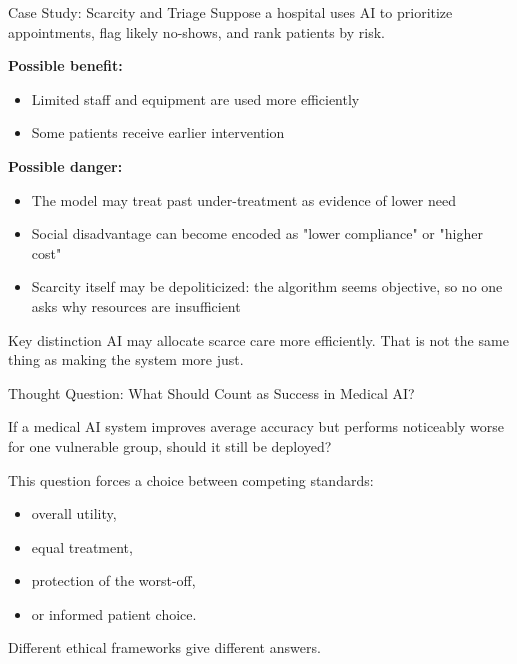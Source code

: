 \documentclass[aspectratio=169,11pt]{beamer}
\begin{document}
\begin{frame}{Case Study: Scarcity and Triage}
Suppose a hospital uses AI to prioritize appointments, flag likely no-shows, and rank patients by risk.

\vspace{0.2cm}
\textbf{Possible benefit:}
\begin{itemize}
    \item Limited staff and equipment are used more efficiently
    \item Some patients receive earlier intervention
\end{itemize}

\vspace{0.2cm}
\textbf{Possible danger:}
\begin{itemize}
    \item The model may treat past under-treatment as evidence of lower need
    \item Social disadvantage can become encoded as "lower compliance" or "higher cost"
    \item Scarcity itself may be depoliticized: the algorithm seems objective, so no one asks why resources are insufficient
\end{itemize}

\begin{alertblock}{Key distinction}
AI may allocate scarce care more efficiently. That is not the same thing as making the system more just.
\end{alertblock}
\end{frame}

\begin{frame}{Thought Question: What Should Count as Success in Medical AI?}
\begin{discussionbox}
\scriptsize
If a medical AI system improves average accuracy but performs noticeably worse for one vulnerable group, should it still be deployed?
\end{discussionbox}

\vspace{0.2cm}
This question forces a choice between competing standards:
\begin{itemize}
    \item overall utility,
    \item equal treatment,
    \item protection of the worst-off,
    \item or informed patient choice.
\end{itemize}

\vspace{0.2cm}
Different ethical frameworks give different answers.
\end{frame}
\end{document}
